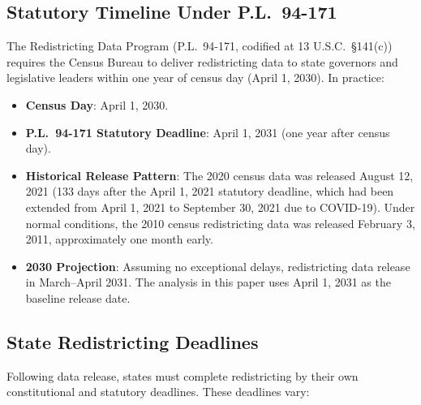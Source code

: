 \label{sec:timeline}

\subsection{Statutory Timeline Under P.L.\ 94-171}

The Redistricting Data Program (P.L.\ 94-171, codified at 13 U.S.C.\ \S 141(c))
requires the Census Bureau to deliver redistricting data to state governors and
legislative leaders within one year of census day (April 1, 2030). In practice:

\begin{itemize}
\item \textbf{Census Day}: April 1, 2030.
\item \textbf{P.L.\ 94-171 Statutory Deadline}: April 1, 2031 (one year after census day).
\item \textbf{Historical Release Pattern}: The 2020 census data was released August 12, 2021
  (133 days after the April 1, 2021 statutory deadline, which had been extended from April 1,
  2021 to September 30, 2021 due to COVID-19). Under normal conditions, the 2010 census
  redistricting data was released February 3, 2011, approximately one month early.
\item \textbf{2030 Projection}: Assuming no exceptional delays, redistricting data release
  in March--April 2031. The analysis in this paper uses April 1, 2031 as the baseline
  release date.
\end{itemize}

\subsection{State Redistricting Deadlines}

Following data release, states must complete redistricting by their own constitutional
and statutory deadlines. These deadlines vary:

